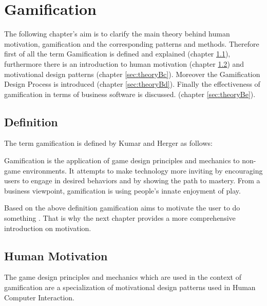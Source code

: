 \newpage
\section{Gamification}
\label{sec:theoryB}

The following chapter's aim is to clarify the main theory behind human motivation, gamification and the corresponding patterns and methods. Therefore first of all the term Gamification is defined and explained (chapter \ref{sec:theoryBa}), furthermore there is an introduction to human motivation (chapter \ref{sec:theoryBb}) and motivational design patterns (chapter \ref{sec:theoryBc}). Moreover the Gamification Design Process is introduced (chapter \ref{sec:theoryBd}). Finally the effectiveness of gamification in terms of business software is discussed. (chapter \ref{sec:theoryBe}).


\subsection{Definition}
\label{sec:theoryBa}

The term gamification is defined by Kumar and Herger as follows:

\begin{fquote}
	Gamification is the application of game design principles and mechanics to
	non-game environments. It attempts to make technology more inviting by encouraging users to engage in desired behaviors and by showing the path to mastery.
	From a business viewpoint, gamification is using people’s innate enjoyment of play.
\end{fquote}

Based on the above definition gamification aims to motivate the user to do something \cite[p. 8]{kumarGamificationWorkDesigning2013}. That is why the next chapter provides a more comprehensive introduction on motivation. 


\subsection{Human Motivation}
\label{sec:theoryBb}

The game design principles and mechanics which are used in the context of gamification are a specialization of motivational design patterns used in Human Computer Interaction. \cite[p. 59]{kumarGamificationWorkDesigning2013}

